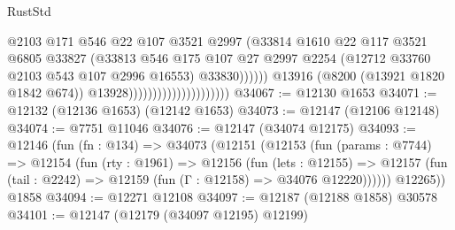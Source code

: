 \begin{lexlean}{RustStd}
\begin{coremodule}
                                                      @2103
                                                      @171
                                                      @546
                                                      @22
                                                      @107
                                                      @3521
                                                      @2997
                                                      (@33814
                                                        @1610
                                                        @22
                                                        @117
                                                        @3521
                                                        @6805
                                                        @33827
                                                        (@33813
                                                          @546
                                                          @175
                                                          @107
                                                          @27
                                                          @2997
                                                          @2254
                                                          (@12712
                                                            @33760
                                                            @2103
                                                            @543
                                                            @107
                                                            @2996
                                                            @16553)
                                                          @33830))))))
                                              @13916
                                              (@8200 (@13921 @1820 @1842 @674))
                                              @13928)))))))))))))))))))))
@34067 := @12130 @1653
@34071 := @12132 (@12136 @1653) (@12142 @1653)
@34073 := @12147 (@12106 @12148)
@34074 := @7751 @11046
@34076 := @12147 (@34074 @12175)
@34093 := @12146
    (fun (fn : @134) =>
    @34073
      (@12151
        (@12153
          (fun (params : @7744) =>
          @12154
            (fun (rty : @1961) =>
            @12156
              (fun (lets : @12155) =>
              @12157 (fun (tail : @2242) => @12159 (fun (Γ : @12158) => @34076 @12220))))))
        @12265))
    @1858
@34094 := @12271 @12108
@34097 := @12187 (@12188 @1858) @30578
@34101 := @12147 (@12179 (@34097 @12195) @12199)

\end{coremodule}
\end{lexlean}
